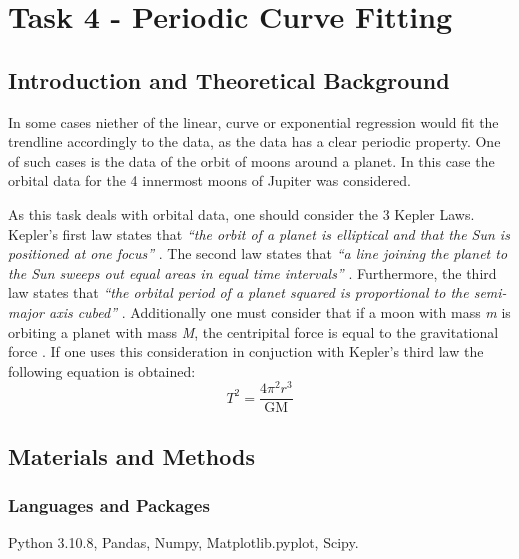 \documentclass[12pt, a4paper]{article}
\begin{document}
\section{Task 4 - Periodic Curve Fitting}

\subsection{Introduction and Theoretical Background}
In some cases niether of the linear, curve or exponential regression would fit the trendline accordingly to the data, as the data has a clear periodic property. One of such cases is the data of the orbit of moons around a planet. In this case the orbital data for the 4 innermost moons of Jupiter was considered. 

As this task deals with orbital data, one should consider the 3 Kepler Laws. Kepler's first law states that \textit{``the orbit of a planet is elliptical and that the Sun is positioned at one focus''} \parencite{muncaster}. The second law states that \textit{``a line joining the planet to the Sun sweeps out equal areas in equal time
intervals''} \parencite{muncaster}. Furthermore, the third law states that \textit{``the orbital period of a planet squared is proportional to the semi-major axis
cubed''} \parencite{muncaster}. Additionally one must consider that if a moon with mass \textit{m} is orbiting a planet with mass \textit{M}, the centripital force is equal to the gravitational force \parencite{muncaster}. If one uses this consideration in conjuction with Kepler's third law the following equation is obtained:
\begin{equation}
    T^2 = \frac{4\pi^2r^3}{\mathrm{GM}}
    \label{eq: equation 4.1}
\end{equation}

\subsection{Materials and Methods}
\subsubsection{Languages and Packages}
Python 3.10.8, Pandas, Numpy, Matplotlib.pyplot, Scipy.
\end{document}
